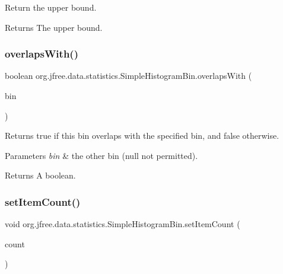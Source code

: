Return the upper bound.

\begin{DoxyReturn}{Returns}
The upper bound. 
\end{DoxyReturn}
\mbox{\label{classorg_1_1jfree_1_1data_1_1statistics_1_1_simple_histogram_bin_ac2eb609b8721c86c1604762283d21d11}} 
\subsubsection{\texorpdfstring{overlaps\+With()}{overlapsWith()}}
{\footnotesize\ttfamily boolean org.\+jfree.\+data.\+statistics.\+Simple\+Histogram\+Bin.\+overlaps\+With (\begin{DoxyParamCaption}\item[{\mbox{\hyperlink{classorg_1_1jfree_1_1data_1_1statistics_1_1_simple_histogram_bin}{Simple\+Histogram\+Bin}}}]{bin }\end{DoxyParamCaption})}

Returns {\ttfamily true} if this bin overlaps with the specified bin, and {\ttfamily false} otherwise.


\begin{DoxyParams}{Parameters}
{\em bin} & the other bin ({\ttfamily null} not permitted).\\
\hline
\end{DoxyParams}
\begin{DoxyReturn}{Returns}
A boolean. 
\end{DoxyReturn}
\mbox{\label{classorg_1_1jfree_1_1data_1_1statistics_1_1_simple_histogram_bin_af592b6fca687f42fc11fda590b61d9d3}} 
\subsubsection{\texorpdfstring{set\+Item\+Count()}{setItemCount()}}
{\footnotesize\ttfamily void org.\+jfree.\+data.\+statistics.\+Simple\+Histogram\+Bin.\+set\+Item\+Count (\begin{DoxyParamCaption}\item[{int}]{count }\end{DoxyParamCaption})}

